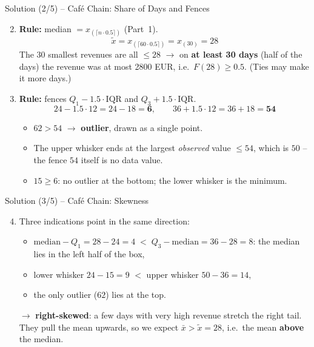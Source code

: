 \documentclass[aspectratio=169,11pt]{beamer}
\begin{document}
\begin{frame}{Solution (2/5) -- Caf\'e Chain: Share of Days and Fences}
  \begin{enumerate}\setcounter{enumi}{1}
    \item \textbf{Rule:} median $= x_{(\lceil n \cdot 0.5 \rceil)}$ (Part~1).
      \[ \tilde{x} = x_{(\lceil 60 \cdot 0.5 \rceil)} = x_{(30)} = 28 \]
      The $30$ smallest revenues are all $\le 28$ $\rightarrow$ on \textbf{at
      least 30 days} (half of the days) the revenue was at most 2800 EUR,
      i.e.\ $F(28) \ge 0.5$. (Ties may make it more days.)
    \item \textbf{Rule:} fences $Q_1 - 1.5 \cdot \text{IQR}$ and
      $Q_3 + 1.5 \cdot \text{IQR}$.
      \[ 24 - 1.5 \cdot 12 = 24 - 18 = \mathbf{6}, \qquad
         36 + 1.5 \cdot 12 = 36 + 18 = \mathbf{54} \]
      \vspace{-0.4cm}
      \begin{itemize}
        \item $62 > 54$ $\rightarrow$ \textbf{outlier}, drawn as a single point.
        \item The upper whisker ends at the largest \emph{observed} value
              $\le 54$, which is $50$ -- the fence $54$ itself is no data value.
        \item $15 \ge 6$: no outlier at the bottom; the lower whisker is the
              minimum.
      \end{itemize}
  \end{enumerate}
\end{frame}

\begin{frame}{Solution (3/5) -- Caf\'e Chain: Skewness}
  \begin{enumerate}\setcounter{enumi}{3}
    \item Three indications point in the same direction:
      \begin{itemize}
        \item $\text{median} - Q_1 = 28 - 24 = 4 \;<\; Q_3 - \text{median} = 36 - 28 = 8$:
              the median lies in the left half of the box,
        \item lower whisker $24 - 15 = 9$ $<$ upper whisker $50 - 36 = 14$,
        \item the only outlier ($62$) lies at the top.
      \end{itemize}
      $\rightarrow$ \textbf{right-skewed}: a few days with very high revenue
      stretch the right tail. They pull the mean upwards, so we expect
      $\bar{x} > \tilde{x} = 28$, i.e.\ the mean \textbf{above} the median.
  \end{enumerate}
\end{frame}
\end{document}
